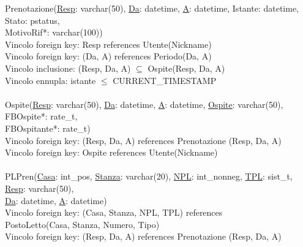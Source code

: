 \documentclass[a4paper,12pt]{report}
\begin{document}
      \hspace*{-0.75cm}
      Prenotazione(\underline{Resp}: varchar(50), \underline{Da}: datetime, \underline{A}: datetime, Istante: datetime, Stato: pstatus, \\
      \hspace*{2cm}MotivoRif*: varchar(100)) \\
      \hspace*{1cm} Vincolo foreign key: Resp references Utente(Nickname) \\
      \hspace*{1cm} Vincolo foreign key: (Da, A) references Periodo(Da, A) \\
      \hspace*{1cm} Vincolo inclusione: (Resp, Da, A) $\subseteq$ Ospite(Resp, Da, A) \\
      \hspace*{1cm} Vincolo ennupla: istante $\leq$ CURRENT\_TIMESTAMP \\ \\

      \hspace*{-0.75cm}
      Ospite(\underline{Resp}: varchar(50), \underline{Da}: datetime, \underline{A}: datetime, \underline{Ospite}: varchar(50), FBOspite*: rate\_t, \\
      \hspace*{2cm}FBOspitante*: rate\_t) \\
      \hspace*{1cm} Vincolo foreign key: (Resp, Da, A) references Prenotazione (Resp, Da, A) \\
      \hspace*{1cm} Vincolo foreign key: Ospite references Utente(Nickname) \\ \\

      \hspace*{-0.75cm}
      PLPren(\underline{Casa}: int\_pos, \underline{Stanza}: varchar(20), \underline{NPL}: int\_nonneg, \underline{TPL}: sist\_t, \underline{Resp}: varchar(50), \\
      \hspace*{2cm}\underline{Da}: datetime, \underline{A}: datetime) \\
      \hspace*{1cm} Vincolo foreign key: (Casa, Stanza, NPL, TPL) references \\
      \hspace*{2cm}PostoLetto(Casa, Stanza, Numero, Tipo) \\
      \hspace*{1cm} Vincolo foreign key: (Resp, Da, A) references Prenotazione (Resp, Da, A) \\ \\
\end{document}
